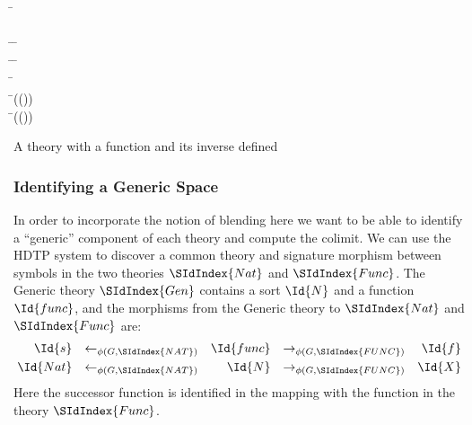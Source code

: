 \begin{listing}[!ht]
\begin{mdframed}
\begin{hetcasl}
\SPEC \= \Ax{=}\\
\> \SORT {}\\
\> \OP \= \Ax{:} \= \Ax{\rightarrow} \\
\> \OP \= \Ax{:} \= \Ax{\rightarrow} \\
\> \Ax{\forall} \= \Ax{:}  \\
\> \Ax{\bullet} \=(()) \Ax{=} \\
\> \Ax{\bullet} \=(()) \Ax{=} \\
\end{hetcasl}
\end{mdframed}
\caption{A theory with a function and its inverse defined}
\label{fig:inv}
\end{listing}



\subsubsection{Identifying a Generic Space}
In order to incorporate the notion of blending here we want to be able
to identify a ``generic'' component of each theory and compute the
colimit.
We can use the
HDTP system \parencite{GustKS2006,Schmidt2010} to discover a common theory
and signature morphism between symbols in the
two theories $\SIdIndex{Nat}$ and $\SIdIndex{Func}$. The Generic theory
$\SIdIndex{Gen}$
contains a sort $\Id{N}$ and a function $\Id{func}$, and the morphisms from the
Generic theory to $\SIdIndex{Nat}$ and $\SIdIndex{Func}$ are:
\begin{align}
  \Id{s}&&\leftarrow_{\phi(G,\SIdIndex{NAT})}&&\Id{func}&&\rightarrow_{\phi(G,\SIdIndex{FUNC})}&&\Id{f}\\
  \Id{Nat}&&\leftarrow_{\phi(G,\SIdIndex{NAT})}&&\Id{N}&&\rightarrow_{\phi(G,\SIdIndex{FUNC})}&&\Id{X}
\end{align}
Here the successor function is identified in the mapping with the
function in the theory $\SIdIndex{Func}$.

